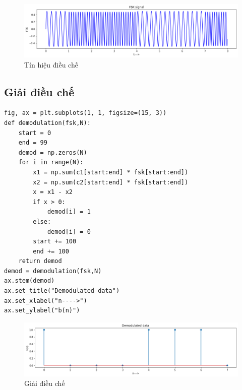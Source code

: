 \begin{center}
    \begin{figure}[htp]
    \begin{center}
     \includegraphics[scale=.5]{Img/modulation.png}
    \end{center}
    \caption{Tín hiệu điều chế}
    \label{refhinh1}
    \end{figure}
\end{center}

\subsection{Giải điều chế}
	
	
\begin{lstlisting}
fig, ax = plt.subplots(1, 1, figsize=(15, 3))
def demodulation(fsk,N):
    start = 0
    end = 99
    demod = np.zeros(N)
    for i in range(N):
        x1 = np.sum(c1[start:end] * fsk[start:end])
        x2 = np.sum(c2[start:end] * fsk[start:end])
        x = x1 - x2
        if x > 0:
            demod[i] = 1
        else:
            demod[i] = 0
        start += 100
        end += 100
    return demod
demod = demodulation(fsk,N)
ax.stem(demod)
ax.set_title("Demodulated data")
ax.set_xlabel("n---->")
ax.set_ylabel("b(n)")
\end{lstlisting}

\begin{center}
    \begin{figure}[htp]
    \begin{center}
     \includegraphics[scale=.5]{Img/demodulation}
    \end{center}
    \caption{Giải điều chế}
    \label{refhinh1}
    \end{figure}
\end{center}

